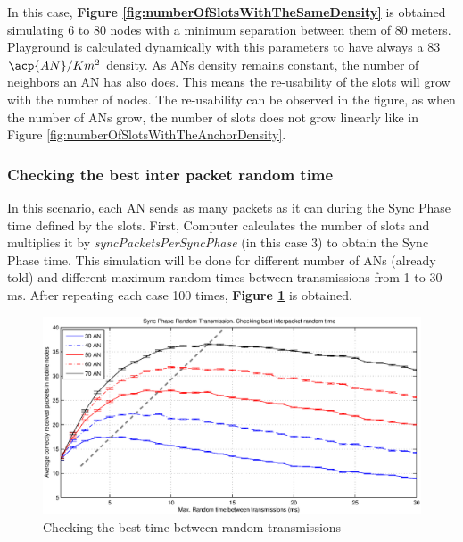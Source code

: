In this case, \textbf{Figure \ref{fig:numberOfSlotsWithTheSameDensity}} is obtained simulating 6 to 80 nodes with a minimum separation between them of 
80 meters. Playground is calculated dynamically with this parameters to have always a 83 $\acp{AN}/Km^2$ density. As \acp{AN} density remains constant,
the number of neighbors an \ac{AN} has also does. This means the re-usability of the slots will grow with the number of nodes. The re-usability can be
observed in the figure, as when the number of \acp{AN} grow, the number of slots does not grow linearly like in Figure 
\ref{fig:numberOfSlotsWithTheAnchorDensity}.

\subsubsection{Checking the best inter packet random time}

In this scenario, each \ac{AN} sends as many packets as it can during the Sync Phase time defined by the slots. First, Computer calculates the number of
slots and multiplies it by \textit{syncPacketsPerSyncPhase} (in this case 3) to obtain the Sync Phase time. This simulation will be done for different
number of \acp{AN} (already told) and different maximum random times between transmissions from 1 to 30 ms. After repeating each case 100 times,
\textbf{Figure \ref{fig:randomTimeCheckingTheBestInterpacketRandomTime}} is obtained.

\begin{figure}[ht]
 \begin{center}
  \includegraphics[width=1\textwidth]{randomTimeCheckingTheBestInterpacketRandomTime.eps}
 \end{center}
 \caption{Checking the best time between random transmissions}
 \label{fig:randomTimeCheckingTheBestInterpacketRandomTime}
\end{figure}

